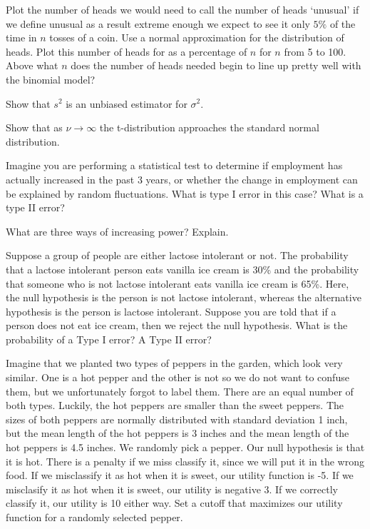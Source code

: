 \begin{exe} Plot the number of heads we would need to call the number of heads `unusual' if we define unusual as a result extreme enough we expect to see it only $5\%$ of the time in $n$ tosses of a coin. Use a normal approximation for the distribution of heads.  Plot this number of heads for as a percentage of $n$ for $n$ from 5 to 100.  Above what $n$ does the number of heads needed begin to line up pretty well with the binomial model? \end{exe}

\begin{exe} Show that $s^2$ is an unbiased estimator for $\sigma^2$. \end{exe}

\begin{exe} Show that as $\nu \to \infty$ the t-distribution approaches the standard normal distribution. \end{exe}

\begin{exe} Imagine you are performing a statistical test to determine if employment has actually increased in the past 3 years, or whether the change in employment can be explained by random fluctuations.  What is type I error in this case? What is a type II error? \end{exe}

\begin{exe} What are three ways of increasing power? Explain. \end{exe}

\begin{exe} Suppose a group of people are either lactose intolerant or not. The probability that a lactose intolerant person eats vanilla ice cream is 30\% and the probability that someone who is not lactose intolerant eats vanilla ice cream is 65\%. Here, the null hypothesis is the person is not lactose intolerant, whereas the alternative hypothesis is the person is lactose intolerant. Suppose you are told that if a person does not eat ice cream, then we reject the null hypothesis. What is the probability of a Type I error? A Type II error? \end{exe}

\begin{exe} Imagine that we planted two types of peppers in the garden, which look very similar.  One is a hot pepper and the other is not so we do not want to confuse them, but we unfortunately forgot to label them.  There are an equal number of both types.  Luckily, the hot peppers are smaller than the sweet peppers.  The sizes of both peppers are normally distributed with standard deviation 1 inch, but the mean length of the hot peppers is 3 inches and the mean length of the hot peppers is 4.5 inches.  We randomly pick a pepper. Our null hypothesis is that it is hot.  There  is a penalty if we miss classify it, since we will put it in the wrong food.  If we misclassify it as hot when it is sweet, our utility function is -5.  If we misclasify it as hot when it is sweet, our utility is negative 3.  If we correctly classify it, our utility is 10 either way.  Set a cutoff that maximizes our utility function for a randomly selected pepper. \end{exe}

